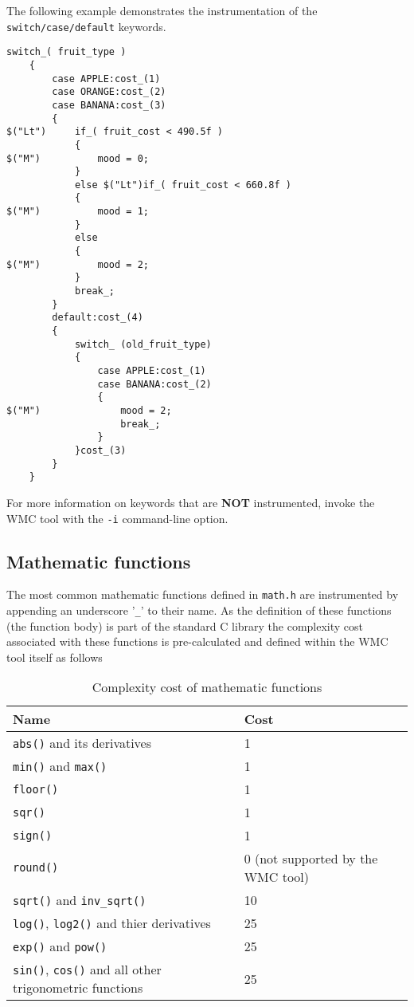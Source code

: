 The following example demonstrates the instrumentation of the \verb|switch/case/default| keywords.

\begin{Verbatim}[fontsize=\small]
    switch_( fruit_type )
    {
        case APPLE:cost_(1)
        case ORANGE:cost_(2)
        case BANANA:cost_(3)
        {
$("Lt")     if_( fruit_cost < 490.5f )
            {
$("M")          mood = 0;
            }
            else $("Lt")if_( fruit_cost < 660.8f )
            {
$("M")          mood = 1;
            }
            else
            {
$("M")          mood = 2;
            }
            break_;
        }
        default:cost_(4)
        {
            switch_ (old_fruit_type)
            {
                case APPLE:cost_(1)
                case BANANA:cost_(2)
                {
$("M")              mood = 2;
                    break_;
                }
            }cost_(3)
        }
    }
\end{Verbatim}

For more information on keywords that are \textbf{NOT} instrumented, invoke the WMC tool with the \verb|-i| command-line option.

\subsection{Mathematic functions}

The most common mathematic functions defined in \verb|math.h| are instrumented by appending an underscore '\verb|_|' to their name. As the definition of these functions (the function body) is part of the standard C library the complexity cost associated with these functions is pre-calculated and defined within the WMC tool itself as follows

\begin{table}[!hb]
\centering\small
\caption{Complexity cost of mathematic functions}
\begin{tabular}{|l|l|}
\hline
\textbf{Name} & \textbf{Cost} \\
\hline
\verb|abs()| and its derivatives & 1 \\
\verb|min()| and \verb|max()| & 1 \\
\verb|floor()| & 1 \\
\verb|sqr()| & 1 \\
\verb|sign()| & 1 \\
\verb|round()| & 0 (not supported by the WMC tool) \\
\verb|sqrt()| and \verb|inv_sqrt()| & 10 \\
\verb|log()|, \verb|log2()| and thier derivatives & 25 \\
\verb|exp()| and \verb|pow()| & 25 \\
\verb|sin()|, \verb|cos()| and all other trigonometric functions & 25 \\
\hline
\end{tabular}
\label{tab:cost_of_math_functions}
\end{table}

